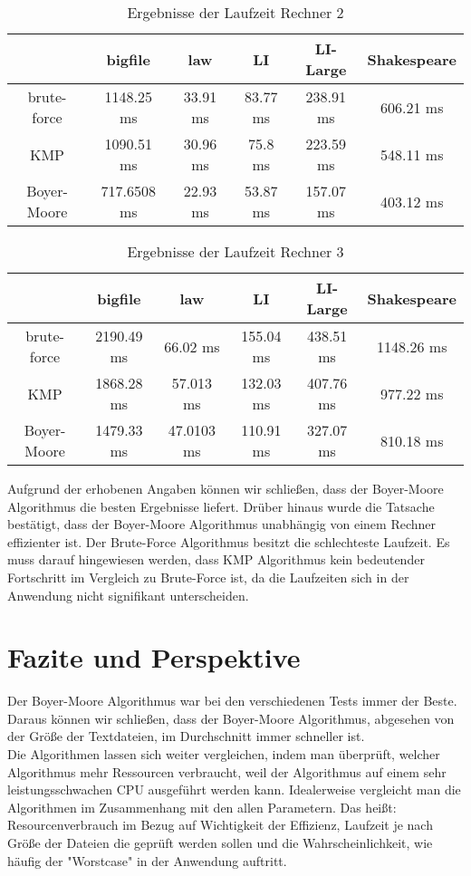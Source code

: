 \documentclass[14pt]{article}
\begin{document}
\begin{table}[h]
\begin{tabular}{ |c|c|c|c|c|c| }
\hline
  & bigfile & law & LI & LI-Large & Shakespeare \\
\hline 
 brute-force & 1148.25 ms &33.91 ms & 83.77 ms& 238.91 ms & 606.21 ms\\ 
\hline
 KMP & 1090.51 ms & 30.96 ms & 75.8 ms & 223.59 ms & 548.11 ms\\ 
\hline
 Boyer-Moore & 717.6508 ms & 22.93 ms & 53.87 ms & 157.07 ms & 403.12 ms\\ 
\hline
\end{tabular}
\label{Ergebnisse}
\caption{ Ergebnisse der Laufzeit Rechner 2}
\end{table}




\begin{table}[h]
\begin{tabular}{ |c|c|c|c|c|c| }
\hline
  & bigfile & law & LI & LI-Large & Shakespeare \\
\hline 
 brute-force & 2190.49 ms &66.02 ms & 155.04 ms& 438.51 ms & 1148.26 ms\\ 
\hline
 KMP & 1868.28 ms & 57.013 ms & 132.03 ms & 407.76 ms & 977.22 ms\\ 
\hline
 Boyer-Moore & 1479.33 ms & 47.0103 ms & 110.91 ms & 327.07 ms & 810.18 ms\\ 
\hline
\end{tabular}
\label{Ergebnisse}
\caption{ Ergebnisse der Laufzeit Rechner 3}
\end{table}




Aufgrund der erhobenen Angaben können wir schließen, dass der Boyer-Moore Algorithmus die besten Ergebnisse liefert. Drüber hinaus wurde die Tatsache bestätigt, dass der Boyer-Moore Algorithmus unabhängig von einem Rechner effizienter ist. Der Brute-Force Algorithmus besitzt die schlechteste Laufzeit. Es muss darauf hingewiesen werden, dass KMP Algorithmus kein bedeutender Fortschritt im Vergleich zu Brute-Force ist, da die Laufzeiten sich in der Anwendung nicht signifikant unterscheiden.

\section{Fazite und Perspektive}
Der Boyer-Moore Algorithmus war bei den verschiedenen Tests immer der Beste. Daraus können wir schließen, dass  der Boyer-Moore Algorithmus, abgesehen von der Größe der Textdateien, im Durchschnitt immer schneller ist. 
\\

Die Algorithmen lassen sich weiter vergleichen, indem man überprüft, welcher Algorithmus mehr Ressourcen verbraucht, weil der Algorithmus auf einem sehr leistungsschwachen CPU ausgeführt werden kann. Idealerweise vergleicht man die Algorithmen im Zusammenhang mit den allen Parametern. Das heißt: Resourcenverbrauch im Bezug auf Wichtigkeit der Effizienz, Laufzeit je nach Größe der Dateien die geprüft werden sollen und die Wahrscheinlichkeit, wie häufig der "Worstcase" in der Anwendung auftritt. 
\end{document}
